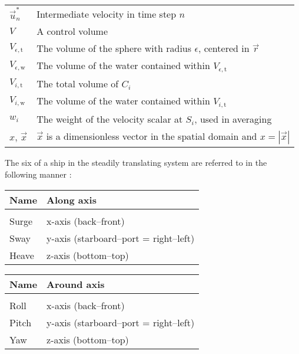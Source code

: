 {\begin{center}
\begin{longtabu}{l X}
    $\vec{u}^*_n$       & Intermediate velocity in time step $n$ \\
    $V$                 & A control volume \\
    $V_{\epsilon,\text{t}}$     & The volume of the sphere with radius $\epsilon$,
                                  centered in $\vec{r}$ \\
    $V_{\epsilon,\text{w}}$     & The volume of the water contained within $V_{\epsilon,\text{t}}$ \\
    $V_{i,\text{t}}$    & The total volume of $C_i$ \\
    $V_{i,\text{w}}$    & The volume of the water contained within $V_{i,\text{t}}$ \\
    $w_i$               & The weight of the velocity scalar at $S_i$, used in averaging \\
    $x,\,\vec{x}$       & $\vec{x}$ is a dimensionless vector in the spatial domain
                          and $x = |\vec{x}|$ \\
\end{longtabu}
\end{center}
}


\begin{center}
\tableoftaa
\end{center}




The six \DOF of a ship in the steadily translating system are referred to in the following manner \citep{Journee2001}:


\begin{longtabu}{l X}
    \textbf{Name} & \textbf{Along axis} \\
    \hline
    \\
    \endhead
    
	Surge & x-axis (back--front) \\
	Sway  & y-axis (starboard--port = right--left) \\
	Heave & z-axis (bottom--top) \\
\end{longtabu}


\begin{longtabu}{l X}
    \textbf{Name} & \textbf{Around axis}\\
    \hline
    \\
    \endhead
    
    Roll  & x-axis (back--front) \\
    Pitch & y-axis (starboard--port = right--left) \\
    Yaw   & z-axis (bottom--top) \\
\end{longtabu}


